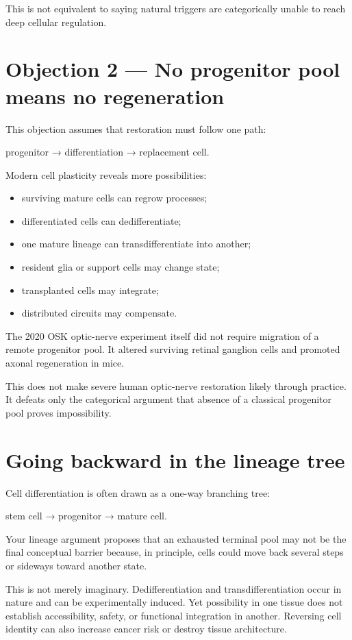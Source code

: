 This is not equivalent to saying natural triggers are categorically unable to reach deep cellular regulation.

\section{Objection 2 --- No progenitor pool means no regeneration}

This objection assumes that restoration must follow one path:

progenitor → differentiation → replacement cell.

Modern cell plasticity reveals more possibilities:

\begin{itemize}
\tightlist
\item
  surviving mature cells can regrow processes;
\item
  differentiated cells can dedifferentiate;
\item
  one mature lineage can transdifferentiate into another;
\item
  resident glia or support cells may change state;
\item
  transplanted cells may integrate;
\item
  distributed circuits may compensate.
\end{itemize}

The 2020 OSK optic-nerve experiment itself did not require migration of a remote progenitor pool. It altered surviving retinal ganglion cells and promoted axonal regeneration in mice.

This does not make severe human optic-nerve restoration likely through practice. It defeats only the categorical argument that absence of a classical progenitor pool proves impossibility.

\section{Going backward in the lineage tree}

Cell differentiation is often drawn as a one-way branching tree:

stem cell → progenitor → mature cell.

Your lineage argument proposes that an exhausted terminal pool may not be the final conceptual barrier because, in principle, cells could move back several steps or sideways toward another state.

This is not merely imaginary. Dedifferentiation and transdifferentiation occur in nature and can be experimentally induced. Yet possibility in one tissue does not establish accessibility, safety, or functional integration in another. Reversing cell identity can also increase cancer risk or destroy tissue architecture.

